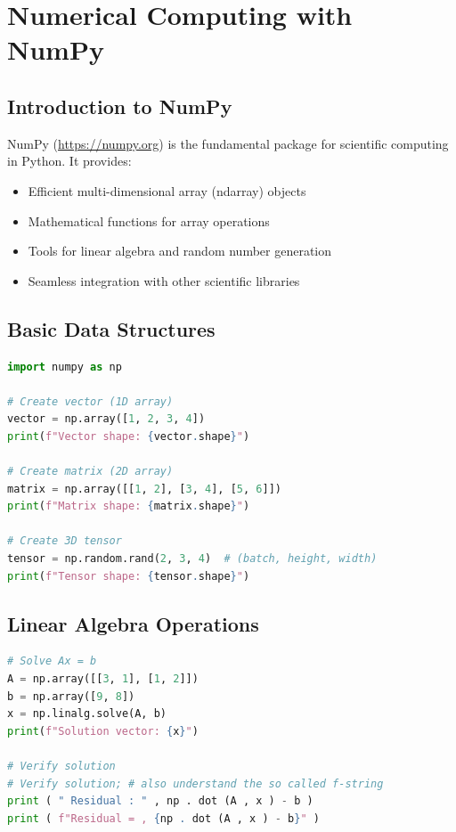 \documentclass[12pt]{article}
\begin{document}
\section{Numerical Computing with NumPy}
\subsection{Introduction to NumPy}
NumPy (\url{https://numpy.org}) is the fundamental package for scientific computing in Python. It provides:
\begin{itemize}
\item Efficient multi-dimensional array (ndarray) objects
\item Mathematical functions for array operations
\item Tools for linear algebra and random number generation
\item Seamless integration with other scientific libraries
\end{itemize}

\subsection{Basic Data Structures}
\begin{lstlisting}[numbers=none,language=Python, caption=Common codes for Google Drive Access]
import numpy as np

# Create vector (1D array)
vector = np.array([1, 2, 3, 4])
print(f"Vector shape: {vector.shape}")

# Create matrix (2D array)
matrix = np.array([[1, 2], [3, 4], [5, 6]])
print(f"Matrix shape: {matrix.shape}")

# Create 3D tensor
tensor = np.random.rand(2, 3, 4)  # (batch, height, width)
print(f"Tensor shape: {tensor.shape}")
\end{lstlisting}

\subsection{Linear Algebra Operations}
\begin{lstlisting}[numbers=none,language=Python, caption=Solving Linear Systems]
# Solve Ax = b
A = np.array([[3, 1], [1, 2]])
b = np.array([9, 8])
x = np.linalg.solve(A, b)
print(f"Solution vector: {x}")

# Verify solution
# Verify solution; # also understand the so called f-string
print ( " Residual : " , np . dot (A , x ) - b )
print ( f"Residual = , {np . dot (A , x ) - b}" )

\end{lstlisting}
\end{document}
